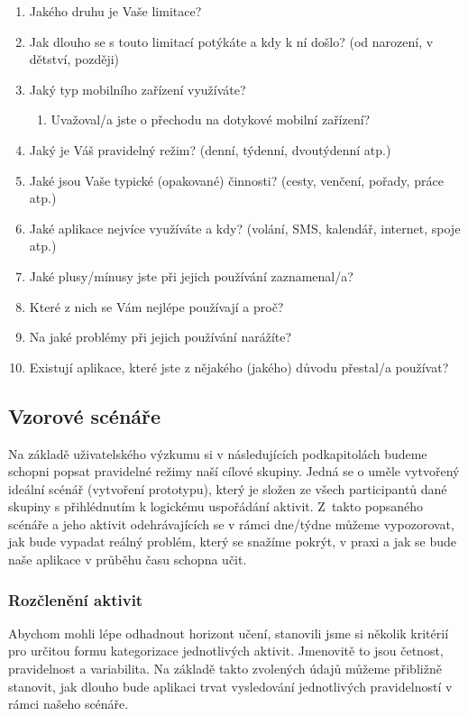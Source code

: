 \documentclass[thesis=M,czech]{FITthesis}[2012/06/26]
\begin{document}
\begin{enumerate}
\item Jakého druhu je Vaše limitace?
\item Jak dlouho se s touto limitací potýkáte a kdy k ní došlo? (od narození, v dětství, později)
\item Jaký typ mobilního zařízení využíváte?
\begin{enumerate}
\item Uvažoval/a jste o přechodu na dotykové mobilní zařízení?
\end{enumerate}
\item Jaký je Váš pravidelný režim? (denní, týdenní, dvoutýdenní atp.)
\item Jaké jsou Vaše typické (opakované) činnosti? (cesty, venčení, pořady, práce atp.)
\item Jaké aplikace nejvíce využíváte a kdy? (volání, SMS, kalendář, internet, spoje atp.)
\item Jaké plusy/mínusy jste při jejich používání zaznamenal/a?
\item Které z nich se Vám nejlépe používají a proč?
\item Na jaké problémy při jejich používání narážíte?
\item Existují aplikace, které jste z nějakého (jakého) důvodu přestal/a používat?
\end{enumerate}

\subsection{Vzorové scénáře}\label{scenario}
Na základě uživatelského výzkumu si v následujících podkapitolách budeme schopni popsat pravidelné režimy naší cílové skupiny. Jedná se o uměle vytvořený ideální scénář (vytvoření prototypu), který je složen ze všech participantů dané skupiny s přihlédnutím k logickému uspořádání aktivit. Z~takto popsaného scénáře a jeho aktivit odehrávajících se v rámci dne/týdne můžeme vypozorovat, jak bude vypadat reálný problém, který se snažíme pokrýt, v praxi a jak se bude naše aplikace v průběhu času schopna učit.

\subsubsection*{Rozčlenění aktivit}
Abychom mohli lépe odhadnout horizont učení, stanovili jsme si několik kritérií pro určitou formu kategorizace jednotlivých aktivit. Jmenovitě to jsou četnost, pravidelnost a variabilita. Na základě takto zvolených údajů můžeme přibližně stanovit, jak dlouho bude aplikaci trvat vysledování jednotlivých pravidelností v rámci našeho scénáře.
\end{document}
